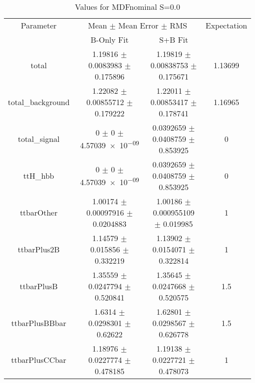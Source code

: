 \begin{table}
\centering
\caption{Values for MDFnominal S=0.0}
\begin{tabular}{cccc}
\toprule
Parameter & \multicolumn{2}{c}{Mean $\pm$ Mean Error $\pm$ RMS} & Expectation\\
 & B-Only Fit & S+B Fit & \\
\midrule
total & \num{1.19816} $\pm$ \num{0.0083983} $\pm$ \num{0.175896} & \num{1.19819} $\pm$ \num{0.00838753} $\pm$ \num{0.175671} & \num{1.13699}\\
total\_background & \num{1.22082} $\pm$ \num{0.00855712} $\pm$ \num{0.179222} & \num{1.22011} $\pm$ \num{0.00853417} $\pm$ \num{0.178741} & \num{1.16965}\\
total\_signal & \num{0} $\pm$ \num{0} $\pm$ \num{4.57039e-09} & \num{0.0392659} $\pm$ \num{0.0408759} $\pm$ \num{0.853925} & \num{0}\\
ttH\_hbb & \num{0} $\pm$ \num{0} $\pm$ \num{4.57039e-09} & \num{0.0392659} $\pm$ \num{0.0408759} $\pm$ \num{0.853925} & \num{0}\\
ttbarOther & \num{1.00174} $\pm$ \num{0.00097916} $\pm$ \num{0.0204883} & \num{1.00186} $\pm$ \num{0.000955109} $\pm$ \num{0.019985} & \num{1}\\
ttbarPlus2B & \num{1.14579} $\pm$ \num{0.015856} $\pm$ \num{0.332219} & \num{1.13902} $\pm$ \num{0.0154071} $\pm$ \num{0.322814} & \num{1}\\
ttbarPlusB & \num{1.35559} $\pm$ \num{0.0247794} $\pm$ \num{0.520841} & \num{1.35645} $\pm$ \num{0.0247668} $\pm$ \num{0.520575} & \num{1.5}\\
ttbarPlusBBbar & \num{1.6314} $\pm$ \num{0.0298301} $\pm$ \num{0.62622} & \num{1.62801} $\pm$ \num{0.0298567} $\pm$ \num{0.626778} & \num{1.5}\\
ttbarPlusCCbar & \num{1.18976} $\pm$ \num{0.0227774} $\pm$ \num{0.478185} & \num{1.19138} $\pm$ \num{0.0227721} $\pm$ \num{0.478073} & \num{1}\\
\bottomrule
\end{tabular}
\end{table}